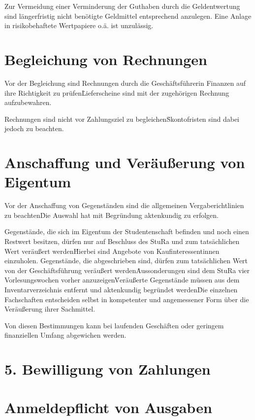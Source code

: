 \begin{multicols}{2}
\Abs \Satz Zur Vermeidung einer Verminderung der Guthaben durch die Geldentwertung sind längerfristig nicht benötigte Geldmittel entsprechend anzulegen. Eine Anlage in risikobehaftete Wertpapiere o.ä. ist unzulässig.



\section{Begleichung von Rechnungen}

\Abs \Satz Vor der Begleichung sind Rechnungen durch die Geschäftsführerin Finanzen auf ihre Richtigkeit zu prüfen\. Lieferscheine sind mit der zugehörigen Rechnung aufzubewahren.

\Abs \Satz Rechnungen sind nicht vor Zahlungsziel zu begleichen\. Skontofristen sind dabei jedoch zu beachten.



\section{Anschaffung und Veräußerung von Eigentum}

\Abs \Satz Vor der Anschaffung von Gegenständen sind die allgemeinen Vergaberichtlinien zu beachten\. Die Auswahl hat mit Begründung aktenkundig zu erfolgen.

\Abs \Satz Gegenstände, die sich im Eigentum der Studentenschaft befinden und noch einen Restwert besitzen, dürfen nur auf Beschluss des StuRa und zum tatsächlichen Wert veräußert werden\. Hierbei sind Angebote von Kaufinteressentinnen einzuholen. Gegenstände, die abgeschrieben sind, dürfen zum tatsächlichen Wert von der Geschäftsführung veräußert werden\. Aussonderungen sind dem StuRa vier Vorlesungswochen vorher anzuzeigen\. Veräußerte Gegenstände müssen aus dem Inventarverzeichnis entfernt und aktenkundig begründet werden\. Die einzelnen Fachschaften entscheiden selbst in kompetenter und angemessener Form über die Veräußerung ihrer Sachmittel.

\Abs \Satz Von diesen Bestimmungen kann bei laufenden Geschäften oder geringem finanziellen Umfang abgewichen werden.


\section*{5. Bewilligung von Zahlungen}



\section{Anmeldepflicht von Ausgaben}


\end{multicols}
